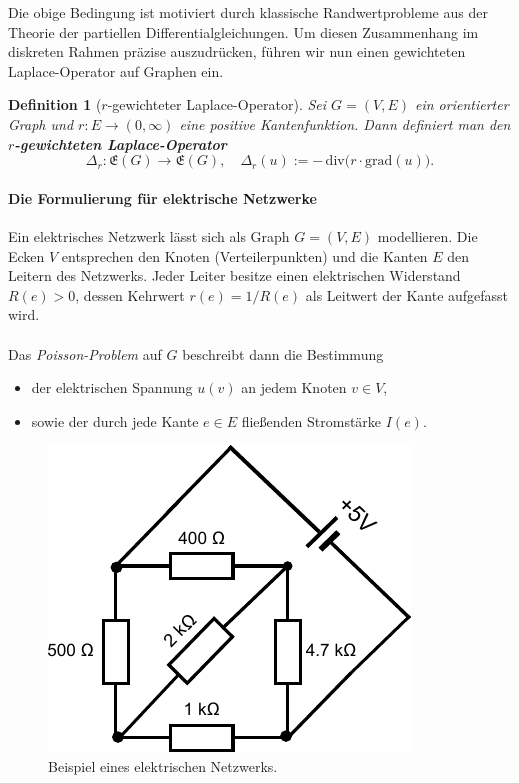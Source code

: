 \documentclass[11pt,a4paper,leqno]{report}
\newtheorem{definition}[theorem]{Definition}
\numberwithin{equation}{chapter}
\begin{document}
Die obige Bedingung ist motiviert durch klassische Randwertprobleme 
aus der Theorie der partiellen Differentialgleichungen. 
Um diesen Zusammenhang im diskreten Rahmen präzise auszudrücken, 
führen wir nun einen gewichteten Laplace-Operator auf Graphen ein.
\begin{definition}[$r$-gewichteter Laplace-Operator]
	Sei $G=(V,E)$ ein orientierter Graph und 
	$r:E \to (0,\infty)$ eine positive Kantenfunktion. 
	Dann definiert man den \textbf{$r$-gewichteten Laplace-Operator}
	\[
	\Delta_r : \mathfrak{E}(G) \longrightarrow \mathfrak{E}(G), 
	\quad 
	\Delta_r(u) := -\,\mathrm{div}\!\bigl(r \cdot \mathrm{grad}(u)\bigr).
	\]
\end{definition}
\paragraph{Die Formulierung für elektrische Netzwerke}
Ein elektrisches Netzwerk lässt sich als Graph $G=(V,E)$ modellieren. 
Die Ecken $V$ entsprechen den Knoten (Verteilerpunkten) und die Kanten $E$ 
den Leitern des Netzwerks. Jeder Leiter besitze einen elektrischen Widerstand 
$R(e)>0$, dessen Kehrwert $r(e)=1/R(e)$ als Leitwert der Kante aufgefasst wird. \\ 
\\
Das \emph{Poisson-Problem} auf $G$ beschreibt dann die Bestimmung
\begin{itemize}
	\item der elektrischen Spannung $u(v)$ an jedem Knoten $v\in V$, 
	\item sowie der durch jede Kante $e\in E$ fließenden Stromstärke $I(e)$.
\end{itemize}

\begin{figure}[H]
	\centering
	\includegraphics[scale=0.6]{Abbildungen/stromkreis_1.pdf}
	\caption{Beispiel eines elektrischen Netzwerks.}
\end{figure}
\end{document}
